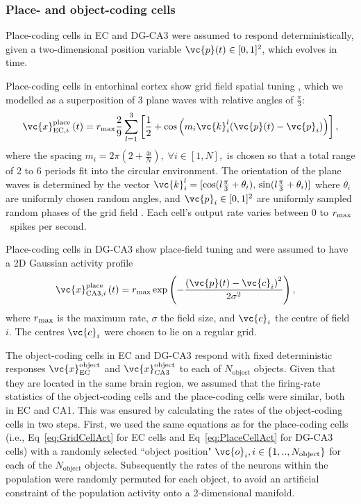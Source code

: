\subsubsection{Place- and object-coding cells}
Place-coding cells in EC and DG-CA3 were assumed to respond deterministically, given a two-dimensional position variable $\vc{p}(t) \in [0,1]^2$, which evolves in time.

Place-coding cells in entorhinal cortex show grid field spatial tuning \cite{Moser2008}, which we modelled as a superposition of 3 plane waves with relative angles of $\tfrac{\pi}{3}$:
\begin{equation}
\vc{x}^{\mathrm{place}}_{{\rm EC},i}\left(t\right) = r_{\rm max} \frac{2}{9}  \sum_{l=1}^3
\left[
\frac{1}{2} + \mathrm{cos} \left( m_i \vc{k}^l_i  (\vc{p}(t) - \vc{p}_i)  \right)
\right]
,
\label{eq:GridCellAct}
\end{equation}
where the spacing $m_i = 2\pi \left(2 + \frac{4 i}{N}\right), \; \forall i \in [1, N],$ is chosen so that a total range of 2 to 6 periods fit into the circular environment. The orientation of the plane waves is determined by the vector $\vc{k}^l_i = [\cos(l \frac{\pi}{3} + \theta_i ), \, \sin(l \frac{\pi}{3} + \theta_i )]$ where $\theta_i$ are uniformly chosen random angles, and $\vc{p}_i \in [0,1]^2$ are uniformly sampled random phases of the grid field \cite{Solstad2006}. Each cell's output rate varies between 0 to $r_{\rm max}$~spikes per second.

Place-coding cells in DG-CA3 show place-field tuning and were assumed to have a 2D Gaussian activity profile
\begin{align}
\vc{x}_{{\rm CA3},i}^{\mathrm{place}}\left(t\right) &= r_{\rm max}\, \mathrm{exp} \left( - \frac{\left( \vc{p}(t) - \vc{c}_i \right)^2}{2\sigma^2} \right), \label{eq:PlaceCellAct}
\end{align}
where $r_{\rm max}$ is the maximum rate, $\sigma$ the field size, and $\vc{c}_i$ the centre of field $i$. The centres $\vc{c}_i$ were chosen to lie on a regular grid.

The object-coding cells in EC and DG-CA3 respond with fixed deterministic responses $\vc{x}^{\rm object}_{\rm EC}$ and $\vc{x}^{\rm object}_{\rm CA3}$ to each of $N_{\mathrm{object}}$ objects.
Given that they are located in the same brain region, we assumed that the firing-rate statistics of the object-coding cells and the place-coding cells were similar, both in EC and CA1. This was ensured by calculating the rates of the object-coding cells in two steps. First, we used the same equations as for the place-coding cells (i.e., Eq~\eqref{eq:GridCellAct} for EC cells and Eq~\eqref{eq:PlaceCellAct} for DG-CA3 cells) with a randomly selected ``object position" $\vc{o}_i, i \in \{1,..,N_{\mathrm{object}}\}$ for each of the $N_{\mathrm{object}}$ objects. Subsequently the rates of the neurons within the population were randomly permuted for each object, to avoid an artificial constraint of the population activity onto a 2-dimensional manifold.

